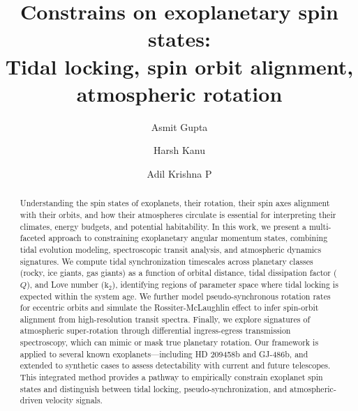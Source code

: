 \documentclass[a4paper,11pt]{article}
\numberwithin{equation}{section}
\begin{document}
\title{\textbf{Constrains on exoplanetary spin states:\\ Tidal locking, spin orbit alignment, atmospheric rotation}}

\author[a]{Asmit Gupta}
\author[b]{Harsh Kanu}
\author[c]{Adil Krishna P}


\maketitle
\thispagestyle{empty}

\begin{abstract}
Understanding the spin states of exoplanets, their rotation, their spin axes alignment with their orbits, and how their atmospheres circulate is essential for interpreting their climates, energy budgets, and potential habitability. In this work, we present a multi-faceted approach to constraining exoplanetary angular momentum states, combining tidal evolution modeling, spectroscopic transit analysis, and atmospheric dynamics signatures. We compute tidal synchronization timescales across planetary classes (rocky, ice giants, gas giants) as a function of orbital distance, tidal dissipation factor ($Q$), and Love number ($\mathrm{k_2}$), identifying regions of parameter space where tidal locking is expected within the system age. We further model pseudo-synchronous rotation rates for eccentric orbits and simulate the Rossiter-McLaughlin effect to infer spin-orbit alignment from high-resolution transit spectra. Finally, we explore signatures of atmospheric super-rotation through differential ingress-egress transmission spectroscopy, which can mimic or mask true planetary rotation. Our framework is applied to several known exoplanets—including HD 209458b and GJ-486b, and extended to synthetic cases to assess detectability with current and future telescopes. This integrated method provides a pathway to empirically constrain exoplanet spin states and distinguish between tidal locking, pseudo-synchronization, and atmospheric-driven velocity signals.\\
\\
\end{abstract}
\end{document}
